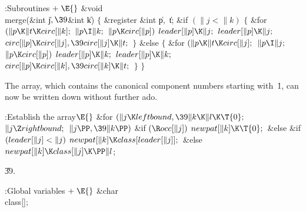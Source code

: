 \B{}:Subroutines\X${}\mathrel+\E{}$\6
\&{void} \\{merge}(\&{int} \|j${},\39{}$\&{int} \|k)\1\1\2\2\6
${}\{{}$\1\6
\&{register} \&{int} \|p${},{}$ \|t;\7
\&{if} ${}(\|j<\|k){}$\5
${}\{{}$\1\6
\&{for} ${}(\|p\K\|t\K\\{circ}[\|k];{}$ ${}\|p\I\|k;{}$ ${}\|p\K\\{circ}[%
\|p]){}$\1\5
${}\\{leader}[\|p]\K\|j;{}$\2\6
${}\\{leader}[\|p]\K\|j;{}$\6
${}\\{circ}[\|p]\K\\{circ}[\|j],\39\\{circ}[\|j]\K\|t;{}$\6
\4${}\}{}$\5
\2\&{else}\5
${}\{{}$\1\6
\&{for} ${}(\|p\K\|t\K\\{circ}[\|j];{}$ ${}\|p\I\|j;{}$ ${}\|p\K\\{circ}[%
\|p]){}$\1\5
${}\\{leader}[\|p]\K\|k;{}$\2\6
${}\\{leader}[\|p]\K\|k;{}$\6
${}\\{circ}[\|p]\K\\{circ}[\|k],\39\\{circ}[\|k]\K\|t;{}$\6
\4${}\}{}$\2\6
\4${}\}{}$\2\par
\fi

The  array, which contains the canonical
component
numbers starting with~\.1, can now be written down without further ado.

\Y\B\4:Establish the  array\X${}\E{}$\6
\&{for} ${}(\|j\K\\{leftbound},\39\|k\K\|l\K\T{0};{}$ ${}\|j\Z%
\\{rightbound};{}$ ${}\|j\PP,\39\|k\PP){}$\1\6
\&{if} ${}(\R\\{occ}[\|j]){}$\1\5
${}\\{newpat}[\|k]\K\T{0};{}$\2\6
\&{else} \&{if} ${}(\\{leader}[\|j]<\|j){}$\1\5
${}\\{newpat}[\|k]\K\\{class}[\\{leader}[\|j]];{}$\2\6
\&{else}\1\5
${}\\{newpat}[\|k]\K\\{class}[\|j]\K\PP\|l{}$;\2\2\par
\U39.\fi

\B{}:Global variables\X${}\mathrel+\E{}$\6
\&{char} \\{class}[];\par
\fi

